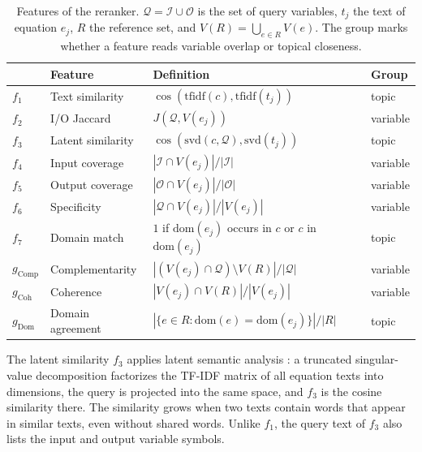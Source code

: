 \begin{table}[tbp]
\centering
\caption{Features of the reranker. $\mathcal{Q} = \mathcal{I} \cup \mathcal{O}$ is the set of query
variables, $t_j$ the text of equation $e_j$, $R$ the reference set, and
$V(R) = \bigcup_{e \in R} V(e)$. The group marks whether a feature reads variable overlap or
topical closeness.}
\label{tab:features}
\small
\setlength{\tabcolsep}{5pt}
\begin{tabular}{@{}llll@{}}
\toprule
 & Feature & Definition & Group \\
\midrule
$f_1$ & Text similarity     & $\cos(\mathrm{tfidf}(c), \mathrm{tfidf}(t_j))$ & topic \\
$f_2$ & I/O Jaccard         & $J(\mathcal{Q}, V(e_j))$ & variable \\
$f_3$ & Latent similarity   & $\cos(\mathrm{svd}(c, \mathcal{Q}), \mathrm{svd}(t_j))$ & topic \\
$f_4$ & Input coverage      & $|\mathcal{I} \cap V(e_j)| / |\mathcal{I}|$ & variable \\
$f_5$ & Output coverage     & $|\mathcal{O} \cap V(e_j)| / |\mathcal{O}|$ & variable \\
$f_6$ & Specificity         & $|\mathcal{Q} \cap V(e_j)| / |V(e_j)|$ & variable \\
$f_7$ & Domain match        & $1$ if $\mathrm{dom}(e_j)$ occurs in $c$ or $c$ in $\mathrm{dom}(e_j)$ & topic \\
\midrule
$g_{\mathrm{Comp}}$ & Complementarity  & $|(V(e_j) \cap \mathcal{Q}) \setminus V(R)| / |\mathcal{Q}|$ & variable \\
$g_{\mathrm{Coh}}$  & Coherence        & $|V(e_j) \cap V(R)| / |V(e_j)|$ & variable \\
$g_{\mathrm{Dom}}$  & Domain agreement & $|\{e \in R : \mathrm{dom}(e) = \mathrm{dom}(e_j)\}| / |R|$ & topic \\
\bottomrule
\end{tabular}
\end{table}

The latent similarity $f_3$ applies latent semantic analysis \citep{LSA}: a truncated
singular-value decomposition factorizes the TF-IDF matrix of all equation texts into \SvdDim{}
dimensions, the query is projected into the same space, and $f_3$ is the cosine similarity there.
The similarity grows when two texts contain words that appear in similar texts, even without shared
words. Unlike $f_1$, the query text of $f_3$ also lists the input and output variable symbols.

